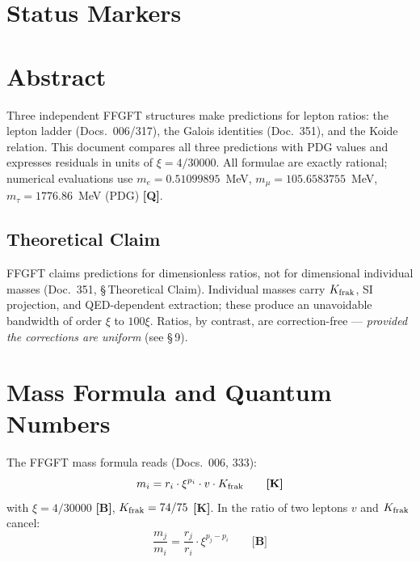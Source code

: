 \providecommand{\BM}{\textbf{[B]}}
\providecommand{\KM}{\textbf{[K]}}
\providecommand{\SM}{\textbf{[S]}}
\providecommand{\QM}{\textbf{[Q]}}

{}

\section*{Status Markers}


\section*{Abstract}

Three independent FFGFT structures make predictions for lepton ratios: the lepton ladder
(Docs.~006/317), the Galois identities (Doc.~351), and the Koide relation. This document
compares all three predictions with PDG values and expresses residuals in units of
$\xi = 4/30000$. All formulae are exactly rational; numerical evaluations use
$m_e = 0.51099895$~MeV, $m_\mu = 105.6583755$~MeV, $m_\tau = 1776.86$~MeV (PDG) \QM.

\subsection*{Theoretical Claim}

FFGFT claims predictions for dimensionless ratios, not for dimensional individual masses
(Doc.~351, §\,Theoretical Claim). Individual masses carry $K_{\rm frak}$, SI projection,
and QED-dependent extraction; these produce an unavoidable bandwidth of order $\xi$ to
$100\xi$. Ratios, by contrast, are correction-free --- \emph{provided the corrections
are uniform} (see §\,9).

\section{Mass Formula and Quantum Numbers}

The FFGFT mass formula reads (Docs.~006, 333):
\begin{equation}
  m_i = r_i \cdot \xi^{p_i} \cdot v \cdot K_{\rm frak} \qquad \KM
\end{equation}
with $\xi = 4/30000$ \BM, $K_{\rm frak} = 74/75$ \KM. In the ratio of two leptons
$v$ and $K_{\rm frak}$ cancel:
\begin{equation}
  \frac{m_j}{m_i} = \frac{r_j}{r_i} \cdot \xi^{p_j - p_i} \qquad \BM
\end{equation}

